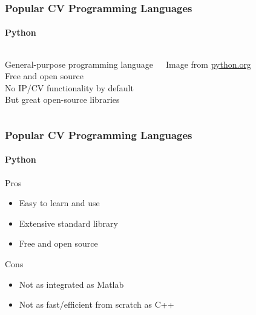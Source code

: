 \documentclass[xetex,professionalfont]{beamer}
\begin{document}
\begin{frame}
\frametitle{Popular CV Programming Languages}
\framesubtitle{Python}

\begin{columns}

General-purpose programming language \\
Free and open source\\ %
No IP/CV functionality by default \\
But great open-source libraries


\begin{center}
{
	{\centering Image from \url{python.org}}}
\end{center}

\end{columns}

\end{frame}


\begin{frame}
\frametitle{Popular CV Programming Languages}
\framesubtitle{Python}

Pros
\begin{itemize}
	\item Easy to learn and use
	\item Extensive standard library
	\item Free and open source
\end{itemize}

\medskip
Cons
\begin{itemize}
	\item Not as integrated as Matlab
	\item Not as fast/efficient from scratch as C++ %
\end{itemize}

\end{frame}

\end{document}
